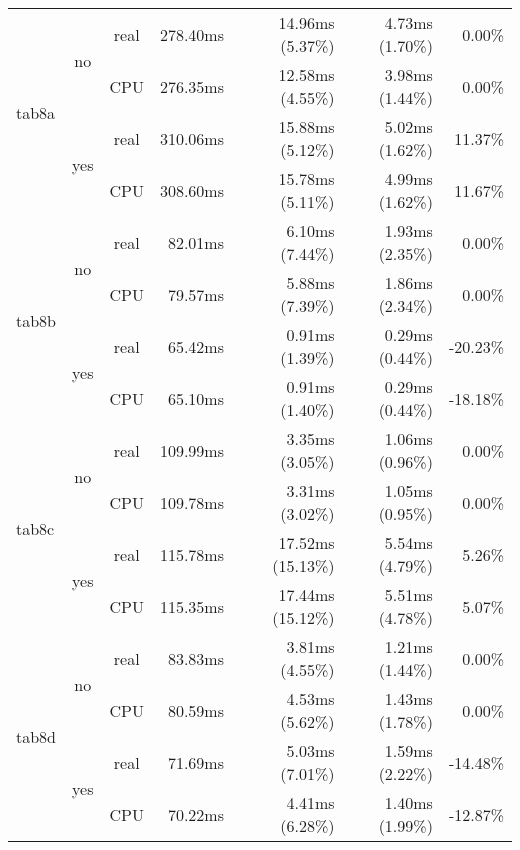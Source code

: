 \documentclass[en]{pracamgr}
\begin{document}
\begin{small}
\begin{longtable}{|l|c|c|r|r|r|r|}
\hline
\multirow{4}{*}{tab8a}    & \multirow{2}{*}{no}  & real & 278.40ms & 14.96ms (5.37\%) & 4.73ms (1.70\%) & 0.00\% \\*
                          &                      & CPU  & 276.35ms & 12.58ms (4.55\%) & 3.98ms (1.44\%) & 0.00\% \\*
                          \cline{2-7}
                          & \multirow{2}{*}{yes} & real & 310.06ms & 15.88ms (5.12\%) & 5.02ms (1.62\%) & 11.37\% \\*
                          &                      & CPU  & 308.60ms & 15.78ms (5.11\%) & 4.99ms (1.62\%) & 11.67\% \\
\hline
\multirow{4}{*}{tab8b}    & \multirow{2}{*}{no}  & real & 82.01ms & 6.10ms (7.44\%) & 1.93ms (2.35\%) & 0.00\% \\*
                          &                      & CPU  & 79.57ms & 5.88ms (7.39\%) & 1.86ms (2.34\%) & 0.00\% \\*
                          \cline{2-7}
                          & \multirow{2}{*}{yes} & real & 65.42ms & 0.91ms (1.39\%) & 0.29ms (0.44\%) & -20.23\% \\*
                          &                      & CPU  & 65.10ms & 0.91ms (1.40\%) & 0.29ms (0.44\%) & -18.18\% \\
\hline
\multirow{4}{*}{tab8c}    & \multirow{2}{*}{no}  & real & 109.99ms & 3.35ms (3.05\%) & 1.06ms (0.96\%) & 0.00\% \\*
                          &                      & CPU  & 109.78ms & 3.31ms (3.02\%) & 1.05ms (0.95\%) & 0.00\% \\*
                          \cline{2-7}
                          & \multirow{2}{*}{yes} & real & 115.78ms & 17.52ms (15.13\%) & 5.54ms (4.79\%) & 5.26\% \\*
                          &                      & CPU  & 115.35ms & 17.44ms (15.12\%) & 5.51ms (4.78\%) & 5.07\% \\
\hline
\multirow{4}{*}{tab8d}    & \multirow{2}{*}{no}  & real & 83.83ms & 3.81ms (4.55\%) & 1.21ms (1.44\%) & 0.00\% \\*
                          &                      & CPU  & 80.59ms & 4.53ms (5.62\%) & 1.43ms (1.78\%) & 0.00\% \\*
                          \cline{2-7}
                          & \multirow{2}{*}{yes} & real & 71.69ms & 5.03ms (7.01\%) & 1.59ms (2.22\%) & -14.48\% \\*
                          &                      & CPU  & 70.22ms & 4.41ms (6.28\%) & 1.40ms (1.99\%) & -12.87\% \\

\end{longtable}
\end{small}
\end{document}
